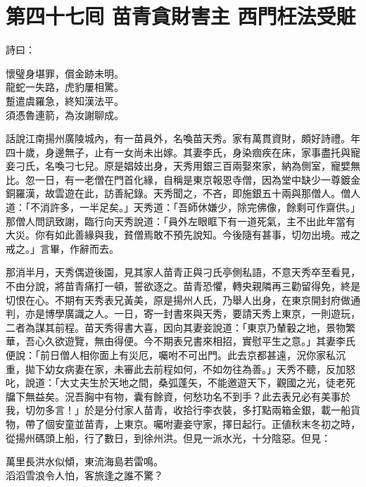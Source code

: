 
\chapter*{第四十七囘 苗青貪財害主 西門枉法受賍}


詩曰：

\begin{myquote}
懷璧身堪罪，償金跡未明。\\龍蛇一失路，虎豹屢相驚。\\蹔遣虞羅急，終知漢法平。\\須憑魯連箭，為汝謝聊成。
\end{myquote}

話說江南揚州廣陵城內，有一苗員外，名喚苗天秀。家有萬貫資財，頗好詩禮。年四十歲，身邊無子，止有一女尚未出嫁。其妻李氏，身染痼疾在床，家事盡托與寵妾刁氏，名喚刁七兒。原是娼妓出身，天秀用銀三百兩娶來家，納為側室，寵嬖無比。{}忽一日，有一老僧在門首化緣，自稱是東京報恩寺僧，因為堂中缺少一尊鍍金銅羅漢，故雲遊在此，訪善紀錄。天秀聞之，不吝，即施銀五十兩與那僧人。僧人道：「不消許多，一半足矣。」天秀道：「吾師休嫌少，除完佛像，餘剩可作齋供。」那僧人問訊致謝，臨行向天秀說道：「員外左眼眶下有一道死氣，主不出此年當有大災。你有如此善緣與我，貧僧焉敢不預先說知。今後隨有甚事，切勿出境。戒之戒之。」言畢，作辭而去。

那消半月，天秀偶遊後園，見其家人苗青正與刁氏亭側私語，不意天秀卒至看見，不由分說，將苗青痛打一頓，誓欲逐之。苗青恐懼，轉央親隣再三勸留得免，終是切恨在心。不期有天秀表兄黃美，原是揚州人氏，乃舉人出身，在東京開封府做通判，亦是博學廣識之人。一日，寄一封書來與天秀，要請天秀上東京，一則遊玩，二者為謀其前程。苗天秀得書大喜，因向其妻妾說道：「東京乃輦轂之地，景物繁華，吾心久欲遊覽，無由得便。今不期表兄書來相招，實慰平生之意。」其妻李氏便說：「前日僧人相你面上有災厄，囑咐不可出門。此去京都甚遠，況你家私沉重，拋下幼女病妻在家，未審此去前程如何，不如勿往為善。」天秀不聽，反加怒叱，說道：「大丈夫生於天地之間，桑弧蓬矢，不能邀遊天下，觀國之光，徒老死牖下無益矣。況吾胸中有物，囊有餘資，何愁功名不到手？此去表兄必有美事於我，切勿多言！」於是分付家人苗青，收拾行李衣裝，多打點兩箱金銀，載一船貨物，帶了個安童並苗青，上東京。囑咐妻妾守家，擇日起行。正値秋末冬初之時，從揚州碼頭上船，行了數日，到徐州洪。但見一派水光，十分陰惡。但見：

\begin{myquote}
萬里長洪水似傾，東流海島若雷鳴。\\滔滔雪浪令人怕，客旅逢之誰不驚？
\end{myquote}


